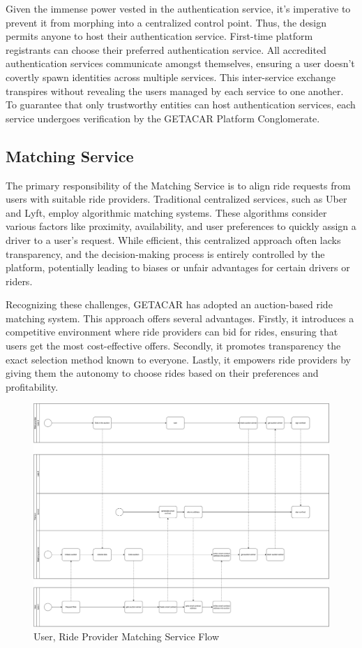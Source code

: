 Given the immense power vested in the authentication service, it's imperative to prevent it from morphing into a centralized control point. Thus, the design permits anyone to host their authentication service. First-time platform registrants can choose their preferred authentication service. All accredited authentication services communicate amongst themselves, ensuring a user doesn't covertly spawn identities across multiple services. This inter-service exchange transpires without revealing the users managed by each service to one another. To guarantee that only trustworthy entities can host authentication services, each service undergoes verification by the GETACAR Platform Conglomerate.

\subsection{Matching Service}
The primary responsibility of the Matching Service is to align ride requests from users with suitable ride providers. Traditional centralized services, such as Uber and Lyft, employ algorithmic matching systems. These algorithms consider various factors like proximity, availability, and user preferences to quickly assign a driver to a user's request. While efficient, this centralized approach often lacks transparency, and the decision-making process is entirely controlled by the platform, potentially leading to biases or unfair advantages for certain drivers or riders.

Recognizing these challenges, GETACAR has adopted an auction-based ride matching system. This approach offers several advantages. Firstly, it introduces a competitive environment where ride providers can bid for rides, ensuring that users get the most cost-effective offers. Secondly, it promotes transparency the exact selection method known to everyone. Lastly, it empowers ride providers by giving them the autonomy to choose rides based on their preferences and profitability.

\begin{figure}[h]
    \centering
    \includegraphics[width=\linewidth]{data/5.svg}
    \caption{User, Ride Provider Matching Service Flow}
    \label{fig:directSVG}
\end{figure}



